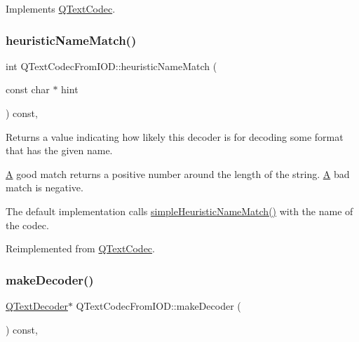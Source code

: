 Implements \mbox{\hyperlink{class_q_text_codec_a4780a608d950994a927de727bb07b9fe}{Q\+Text\+Codec}}.

\mbox{\label{class_q_text_codec_from_i_o_d_af7109ff23e3f6c34228eb046578c0357}} 
\subsubsection{\texorpdfstring{heuristicNameMatch()}{heuristicNameMatch()}}
{\footnotesize\ttfamily int Q\+Text\+Codec\+From\+I\+O\+D\+::heuristic\+Name\+Match (\begin{DoxyParamCaption}\item[{const char $\ast$}]{hint }\end{DoxyParamCaption}) const\hspace{0.3cm}{\ttfamily [inline]}, {\ttfamily [virtual]}}

Returns a value indicating how likely this decoder is for decoding some format that has the given name.

\mbox{\hyperlink{class_a}{A}} good match returns a positive number around the length of the string. \mbox{\hyperlink{class_a}{A}} bad match is negative.

The default implementation calls \mbox{\hyperlink{class_q_text_codec_a16459bb8c9e7c502547f45e5387fbb03}{simple\+Heuristic\+Name\+Match()}} with the name of the codec. 

Reimplemented from \mbox{\hyperlink{class_q_text_codec_a1bcf2f11fac6113fd6ae74dda55b2ca4}{Q\+Text\+Codec}}.

\mbox{\label{class_q_text_codec_from_i_o_d_ae5184561209ee0771ad28d3888a2a89c}} 
\subsubsection{\texorpdfstring{makeDecoder()}{makeDecoder()}}
{\footnotesize\ttfamily \mbox{\hyperlink{class_q_text_decoder}{Q\+Text\+Decoder}}$\ast$ Q\+Text\+Codec\+From\+I\+O\+D\+::make\+Decoder (\begin{DoxyParamCaption}{ }\end{DoxyParamCaption}) const\hspace{0.3cm}{\ttfamily [inline]}, {\ttfamily [virtual]}}

